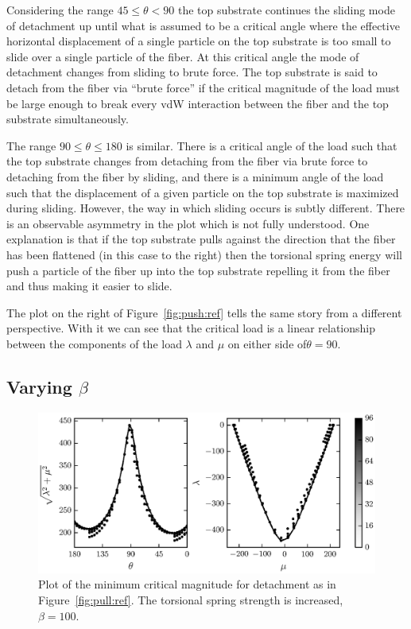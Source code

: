 Considering the range $45 \leq \theta < 90$ the top substrate continues the sliding mode of detachment up until what is assumed to be a critical angle where the effective horizontal displacement of a single particle on the top substrate is too small to slide over a single particle of the fiber. At this critical angle the mode of detachment changes from sliding to brute force. The top substrate is said to detach from the fiber via ``brute force'' if the critical magnitude of the load must be large enough to break every vdW interaction between the fiber and the top substrate simultaneously.

The range $90 \leq \theta \leq 180$ is similar. There is a critical angle of the load such that the top substrate changes from detaching from the fiber via brute force to detaching from the fiber by sliding, and there is a minimum angle of the load such that the displacement of a given particle on the top substrate is maximized during sliding. However, the way in which sliding occurs is subtly different. There is an observable asymmetry in the plot which is not fully understood. One explanation is that if the top substrate pulls against the direction that the fiber has been flattened (in this case to the right) then the torsional spring energy will push a particle of the fiber up into the top substrate repelling it from the fiber and thus making it easier to slide.

The plot on the right of Figure~\ref{fig:push:ref} tells the same story from a different perspective. With it we can see that the critical load is a linear relationship between the components of the load $\lambda$ and $\mu$ on either side of$\theta=90$\textdegree . 
	
	
\subsection{Varying $\beta$}

	\begin{figure}[t]
		\begin{center}
			\includegraphics{./fig/ch3/pull/b100/grid.eps}
		\end{center}		
		\caption{Plot of the minimum critical magnitude for detachment as in Figure~\ref{fig:pull:ref}. The torsional spring strength is increased, $\beta=100$.
		\label{fig:pull:b100}}
	\end{figure}

